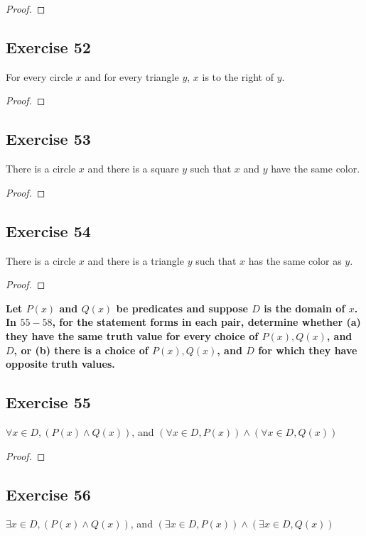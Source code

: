\documentclass[14pt]{extarticle}
\newcommand{\fa}{\forall}
\newcommand{\te}{\exists}
\begin{document}
\begin{proof}

\end{proof}

\subsection{Exercise 52}
For every circle $x$ and for every triangle $y$, $x$ is to the right of $y$.

\begin{proof}

\end{proof}

\subsection{Exercise 53}
There is a circle $x$ and there is a square $y$ such that $x$ and $y$ have the same color.

\begin{proof}

\end{proof}

\subsection{Exercise 54}
There is a circle $x$ and there is a triangle $y$ such that $x$ has the same color as $y$.

\begin{proof}

\end{proof}

{\bf \color{cyan} Let $P(x)$ and $Q(x)$ be predicates and suppose $D$ is the domain of $x$. In $55-58$, for the statement forms in each pair, determine whether (a) they have the same truth value for every choice of $P(x), Q(x)$, and $D$, or (b) there is a choice of $P(x), Q(x)$, and $D$ for which they have opposite truth values.}

\subsection{Exercise 55}
$\fa x \in D, (P(x) \wedge Q(x))$, and $(\fa x \in D, P(x)) \wedge (\fa x \in D, Q(x))$

\begin{proof}

\end{proof}

\subsection{Exercise 56}
$\te x \in D, (P(x) \wedge Q(x))$, and $(\te x \in D, P(x)) \wedge (\te x \in D, Q(x))$
\end{document}
